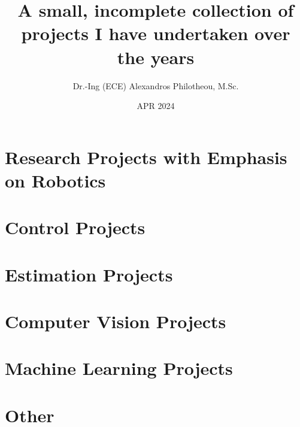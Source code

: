 






  \title{\Huge A small, incomplete collection of projects I have undertaken over the years}
  \author{Dr.-Ing (ECE) Alexandros Philotheou, M.Sc. }
  \date{APR 2024}
  \maketitle
  \vspace{2cm}

  \tableofcontents
  \thispagestyle{empty}
  \cleardoublepage

  \section{Research Projects with Emphasis on Robotics}
    
    \newpage
    
    \newpage

  \section{Control Projects}
    
    \newpage
    
    \newpage
    
    \newpage
    
    \newpage

  \section{Estimation Projects}
    
    \newpage

  \section{Computer Vision Projects}
    
    \newpage

  \section{Machine Learning Projects}
    
    \newpage

  \section{Other}
    

  \printbibliography[notcategory=nobibliography]


